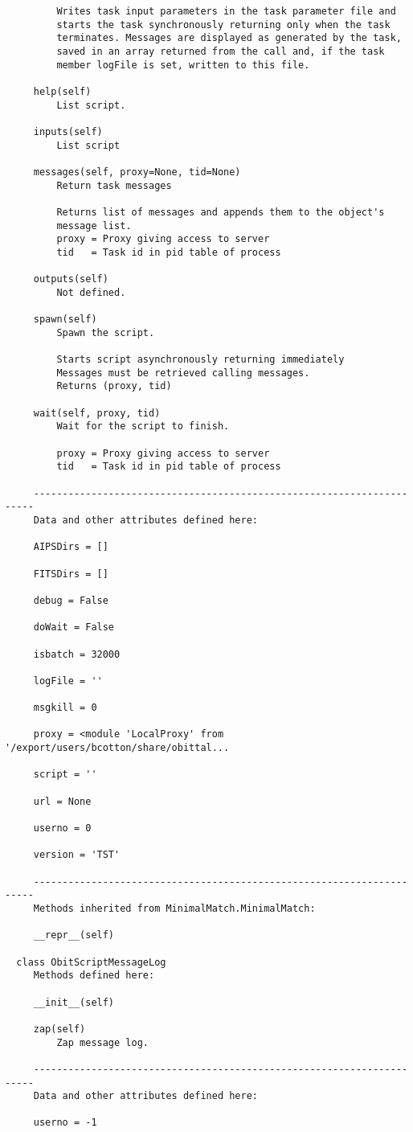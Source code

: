 \documentclass[11pt]{report}
\begin{document}
\begin{verbatim}
         Writes task input parameters in the task parameter file and
         starts the task synchronously returning only when the task
         terminates. Messages are displayed as generated by the task,
         saved in an array returned from the call and, if the task
         member logFile is set, written to this file.
     
     help(self)
         List script.
     
     inputs(self)
         List script
     
     messages(self, proxy=None, tid=None)
         Return task messages
         
         Returns list of messages and appends them to the object's
         message list.        
         proxy = Proxy giving access to server
         tid   = Task id in pid table of process
     
     outputs(self)
         Not defined.
     
     spawn(self)
         Spawn the script.
          
         Starts script asynchronously returning immediately
         Messages must be retrieved calling messages.
         Returns (proxy, tid)
     
     wait(self, proxy, tid)
         Wait for the script to finish.
         
         proxy = Proxy giving access to server
         tid   = Task id in pid table of process
     
     ----------------------------------------------------------------------
     Data and other attributes defined here:
     
     AIPSDirs = []
     
     FITSDirs = []
     
     debug = False
     
     doWait = False
     
     isbatch = 32000
     
     logFile = ''
     
     msgkill = 0
     
     proxy = <module 'LocalProxy' from '/export/users/bcotton/share/obittal...
     
     script = ''
     
     url = None
     
     userno = 0
     
     version = 'TST'
     
     ----------------------------------------------------------------------
     Methods inherited from MinimalMatch.MinimalMatch:
     
     __repr__(self)
    
  class ObitScriptMessageLog
     Methods defined here:
     
     __init__(self)
     
     zap(self)
         Zap message log.
     
     ----------------------------------------------------------------------
     Data and other attributes defined here:
     
     userno = -1
\end{verbatim}
\end{document}
